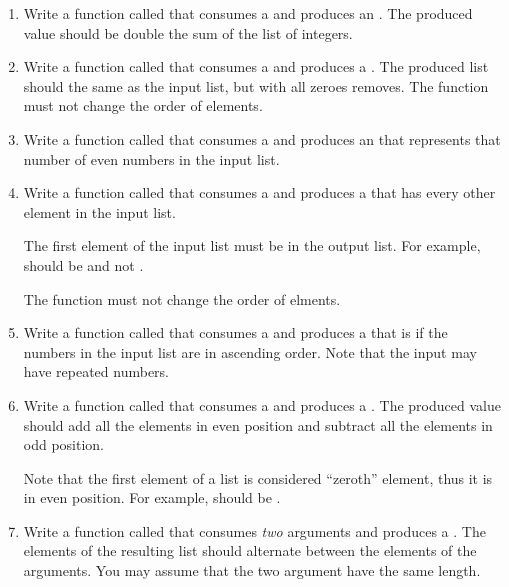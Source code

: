 \documentclass{book}
\begin{document}
\begin{enumerate}

  \item Write a function called  that consumes a
   and produces an . The produced
  value should be double the sum of the list of integers.

  \item Write a function called  that consumes a
   and produces a .
  The produced list should the same as the input list, but with all zeroes
  removes. The function must not change the order of elements.

  \item Write a function called  that consumes a
   and produces an  that represents
  that number of even numbers in the input list.

  \item Write a function called  that consumes a
   and produces a  that
  has every other element in the input list.

  The first element of the input list must be in the output list.
  For example,  should be
   and not .

  The function must not change the order of elments.

  \item Write a function called  that consumes a
   and produces a  that is
   if the numbers in the input list are in ascending order.
  Note that the input may have repeated numbers.

  \item Write a function called  that consumes a
   and produces a . The produced
  value should add all the elements in even position and subtract all the
  elements in odd position.

  Note that the first element of a list is considered
  ``zeroth'' element, thus it is in even position.
  For example,  should be
  .


  \item Write a function called  that consumes \emph{two}
   arguments and produces a .
  The elements of the resulting list should alternate between the elements of
  the arguments. You may assume that the two argument have the same
  length.


\end{enumerate}
\end{document}
